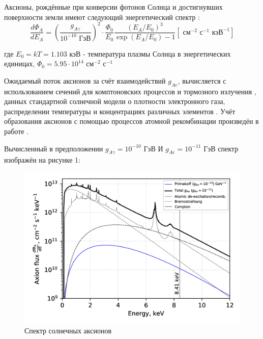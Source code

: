 \documentclass[a4paper,article,14pt]{extarticle}
\begin{document}
Аксионы, рождённые при конверсии фотонов Солнца и достигнувших поверхности земли имеют следующий энергетический спектр \cite{solarflux1, solarflux2, solarflux3}:
\begin{equation}
\frac{{d{\Phi _A}}}{{d{E_A}}} = {\left( {\frac{{{g_{A\gamma }}}}{{{{{10}^{ - 10}}} \text{ ГэВ}}}} \right)^2} \cdot \frac{{{\Phi _0}}}{{{E_0}}}\frac{{{{\left( {{E_A}/{E_0}} \right)}^3}}}{{\exp \left( {{E_A}/{E_0}} \right) - 1}} \left[ \text{ см} ^{-2} \text{ с} ^{-1} \text{ кэВ} ^{-1} \right]
\end{equation}

где ${E_0} = kT = 1.103 \text{ кэВ}$ - температура плазмы Солнца в энергетических единицах, ${{\Phi _0}} = 5.95 \cdot 10^{14} \text{ см} ^{-2} \text{ с} ^{-1}$

Ожидаемый поток аксионов за счёт взаимодействий $g_{Ae}$, вычисляется с использованием сечений для комптоновских процессов \cite{pospelov2008bosonic,gondolo2009solar} и тормозного излучения \cite{brem}, данных стандартной солнечной модели о плотности электронного газа, распределении температуры и концентрациях различных элементов \cite{kekez2009search,derbin2011constraints}. Учёт образования аксионов с помощью процессов атомной рекомбинации произведён в работе \cite{redondo2013solar}.

\newpage
Вычисленный в предположении $g_{A\gamma } = {10}^{ - 10} \text{ ГэВ}$ И $g_{Ae } = {10}^{ - 11} \text{ ГэВ}$ спектр изображён на рисунке 1:

\begin{figure}[h]
    \centering
    \includegraphics[width = \textwidth]{images/flux_solar.png}
    \caption{Спектр солнечных аксионов  \cite{test_bolometric_tm} }
    \label{flux}
\end{figure}
\end{document}
